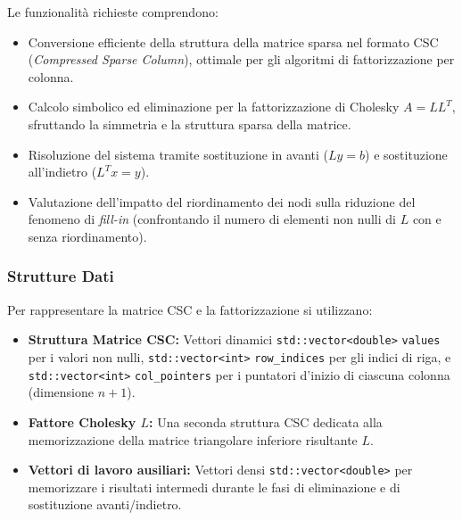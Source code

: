 \documentclass[twocolumn]{article}
\begin{document}
Le funzionalit\`a richieste comprendono:
\begin{itemize}
    \item Conversione efficiente della struttura della matrice sparsa nel formato CSC (\textit{Compressed Sparse Column}), ottimale per gli algoritmi di fattorizzazione per colonna.
    \item Calcolo simbolico ed eliminazione per la fattorizzazione di Cholesky $A = L L^T$, sfruttando la simmetria e la struttura sparsa della matrice.
    \item Risoluzione del sistema tramite sostituzione in avanti ($L y = b$) e sostituzione all'indietro ($L^T x = y$).
    \item Valutazione dell'impatto del riordinamento dei nodi sulla riduzione del fenomeno di \textit{fill-in} (confrontando il numero di elementi non nulli di $L$ con e senza riordinamento).
\end{itemize}

\subsubsection{Strutture Dati}
Per rappresentare la matrice CSC e la fattorizzazione si utilizzano:
\begin{itemize}
    \item \textbf{Struttura Matrice CSC:} Vettori dinamici \texttt{std::vector<double>} \texttt{values} per i valori non nulli, \texttt{std::vector<int>} \texttt{row\_indices} per gli indici di riga, e \texttt{std::vector<int>} \texttt{col\_pointers} per i puntatori d'inizio di ciascuna colonna (dimensione $n+1$).
    \item \textbf{Fattore Cholesky $L$:} Una seconda struttura CSC dedicata alla memorizzazione della matrice triangolare inferiore risultante $L$.
    \item \textbf{Vettori di lavoro ausiliari:} Vettori densi \texttt{std::vector<double>} per memorizzare i risultati intermedi durante le fasi di eliminazione e di sostituzione avanti/indietro.
\end{itemize}
\end{document}
